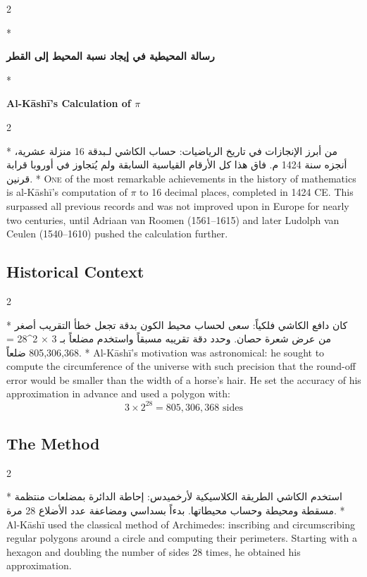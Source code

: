 \documentclass[11pt,a4paper]{article}
\newcommand{\ar}[1]{\arabicfont\beginR #1\endR}
\newenvironment{bilingual}{%
  \vspace{0.3em}%
  \begin{paracol}{2}%
}{%
  \end{paracol}%
  \vspace{0.3em}%
}
\begin{document}
\begin{bilingual}
\switchcolumn[0]*
\begin{center}
\textbf{\Large\color{chapcolor}\ar{رسالة المحيطية في إيجاد نسبة المحيط إلى القطر}}
\end{center}
\switchcolumn[1]*
\begin{center}
\textbf{\Large\color{chapcolor}Al-K\=ash\=i's Calculation of $\pi$}
\end{center}
\end{bilingual}

\begin{bilingual}
\switchcolumn[0]*
\ar{من أبرز الإنجازات في تاريخ الرياضيات: حساب الكاشي لـ\pi بدقة 16 منزلة عشرية، أنجزه سنة 1424 م. فاق هذا كل الأرقام القياسية السابقة ولم يُتجاوز في أوروبا قرابة قرنين.}
\switchcolumn[1]*
\lettrine[lines=3, nindent=0em, findent=3pt]{\color{chapcolor}O}{ne}
of the most remarkable achievements in the history of mathematics is
al-K\=ash\=i's computation of $\pi$ to 16 decimal places, completed in 1424
CE. This surpassed all previous records and was not improved upon in
Europe for nearly two centuries, until Adriaan van Roomen (1561--1615)
and later Ludolph van Ceulen (1540--1610) pushed the calculation
further.
\end{bilingual}

\subsection{Historical Context}

\begin{bilingual}
\switchcolumn[0]*
\ar{كان دافع الكاشي فلكياً: سعى لحساب محيط الكون بدقة تجعل خطأ التقريب أصغر من عرض شعرة حصان. وحدد دقة تقريبه مسبقاً واستخدم مضلعاً بـ 3 × 2^{28} = 805,306,368 ضلعاً.}
\switchcolumn[1]*
Al-K\=ash\=i's motivation was astronomical: he sought to compute the
circumference of the universe with such precision that the round-off
error would be smaller than the width of a horse's hair. He set the
accuracy of his approximation in advance and used a polygon with:
\[
3 \times 2^{28} = 805{,}306{,}368 \text{ sides}
\]
\end{bilingual}

\subsection{The Method}

\begin{bilingual}
\switchcolumn[0]*
\ar{استخدم الكاشي الطريقة الكلاسيكية لأرخميدس: إحاطة الدائرة بمضلعات منتظمة مسقطة ومحيطة وحساب محيطاتها. بدءاً بسداسي ومضاعفة عدد الأضلاع 28 مرة.}
\switchcolumn[1]*
Al-K\=ash\=i used the classical method of Archimedes: inscribing and
circumscribing regular polygons around a circle and computing their
perimeters. Starting with a hexagon and doubling the number of sides
28 times, he obtained his approximation.
\end{bilingual}
\end{document}

